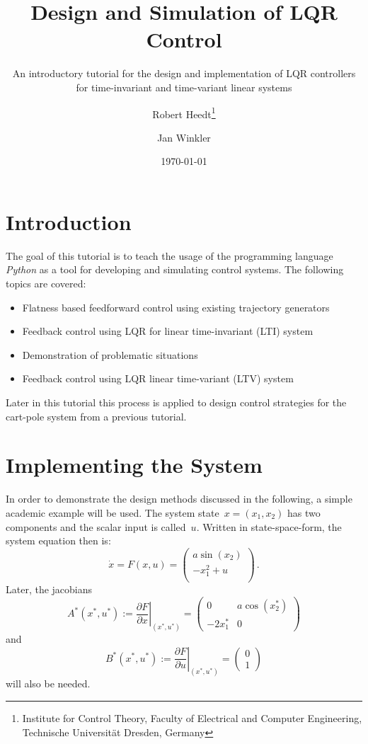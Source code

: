 \documentclass[a4paper,11pt,headinclude=true,headsepline,parskip=half,DIV=13]{scrartcl}
\title{Design and Simulation of LQR Control}
\subtitle{An introductory tutorial for the design and implementation of LQR controllers for time-invariant and time-variant linear systems}
\author{Robert Heedt\thanks{Institute for Control Theory, Faculty of Electrical and Computer Engineering, Technische Universität Dresden, Germany} \and Jan Winkler\footnotemark[1]}
\date{\today}
\newcommand{\py}{\emph{Python}\xspace}
\begin{document}
\maketitle




\tableofcontents

\newpage

\section{Introduction}
The goal of this tutorial is to teach the usage of the programming language \py as a tool for developing and simulating control systems.
The following topics are covered:
\begin{itemize}
    \item Flatness based feedforward control using existing trajectory generators
    \item Feedback control using LQR for linear time-invariant (LTI) system
    \item Demonstration of problematic situations
    \item Feedback control using LQR linear time-variant (LTV) system
\end{itemize}
Later in this tutorial this process is applied to design control strategies for the cart-pole system from a previous tutorial.

\section{Implementing the System}
In order to demonstrate the design methods discussed in the following, a simple academic example\autocite{ludyk} will be used.
The system state~$x=(x_1, x_2)$ has two components and the scalar input is called~$u$.
Written in state-space-form, the system equation then is:
\begin{equation}
\dot x = F(x, u) = 
\begin{pmatrix}
a \sin(x_2)\\
-x_1^2+u\\
\end{pmatrix}\,.
\label{eq:academic_example_ss}
\end{equation}
Later, the jacobians
\begin{equation}
A^*(x^*, u^*) := \left.\frac{\partial F}{\partial x}\right\vert_{(x^*, u^*)}= \begin{pmatrix}0 & a \cos(x^*_2)\\-2 x^*_1 & 0\end{pmatrix}
\label{eq:jac_A}
\end{equation}
and
\begin{equation}
B^*(x^*, u^*) := \left.\frac{\partial F}{\partial u}\right\vert_{(x^*, u^*)}= \begin{pmatrix}0 \\ 1\end{pmatrix}
\label{eq:jac_B}
\end{equation}
will also be needed.
\end{document}
